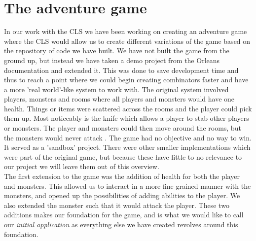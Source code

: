 \section{The adventure game} \label{adventureGame}
In our work with the CLS we have been working on creating an adventure game where the CLS would allow us to create different variations of the game based on the repository of code we have built. We have not built the game from the ground up, but instead we have taken a demo project from the Orleans documentation \cite{AdventureGame} and extended it. This was done to save development time and thus to reach a point where we could begin creating combinators faster and have a more 'real world'-like system to work with. The original system involved players, monsters and rooms where all players and monsters would have one health. Things or items were scattered across the rooms and the player could pick them up. Most noticeably is the knife which allows a player to stab other players or monsters. The player and monsters could then move around the rooms, but the monsters would never attack . The game had no objective and no way to win. It served as a 'sandbox' project. There were other smaller implementations which were part of the original game, but because these have little to no relevance to our project we will leave them out of this overview.\\
The first extension to the game was the addition of health for both the player and monsters. This allowed us to interact in a more fine grained manner with the monsters, and opened up the possibilities of adding abilities to the player. We also extended the monster such that it would attack the player. These two additions makes our foundation for the game, and is what we would like to call our \textit{initial application} as everything else we have created revolves around this foundation.\\

